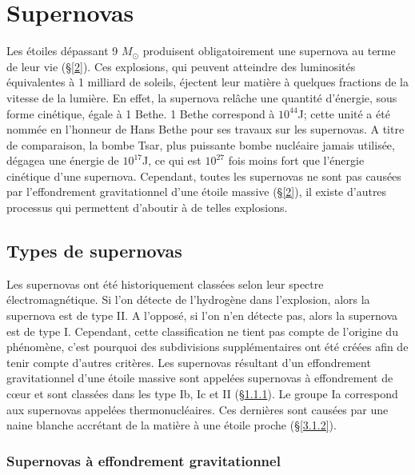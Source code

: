 
\chapterFormat
\chapter{Supernovas}\label{3}

Les étoiles dépassant 9 $M_\odot$ produisent obligatoirement une supernova au terme de leur vie (§\ref{2}). Ces explosions, qui peuvent atteindre des luminosités équivalentes à 1 milliard de soleils, éjectent leur matière à quelques fractions de la vitesse de la lumière. En effet, la supernova relâche une quantité d'énergie, sous forme cinétique, égale à 1 Bethe. 1 Bethe correspond à $10^{44}$J; cette unité a été nommée en l'honneur de Hans Bethe pour ses travaux sur les supernovas. A titre de comparaison, la bombe Tsar, plus puissante bombe nucléaire jamais utilisée, dégagea une énergie de $10^{17}$J, ce qui est $10^{27}$ fois moins fort que l'énergie cinétique d'une supernova. Cependant, toutes les supernovas ne sont pas causées par l'effondrement gravitationnel d'une étoile massive (§\ref{2}), il existe d'autres processus qui permettent d'aboutir à de telles explosions.

\section{Types de supernovas}\label{3.1} 

Les supernovas ont été historiquement classées selon leur spectre électromagnétique. Si l'on détecte de l'hydrogène dans l'explosion, alors la supernova est de type II. A l'opposé, si l'on n'en détecte pas, alors la supernova est de type I. Cependant, cette classification ne tient pas compte de l'origine du phénomène, c'est pourquoi des subdivisions supplémentaires ont été créées afin de tenir compte d'autres critères. Les supernovas résultant d'un effondrement gravitationnel d'une étoile massive sont appelées supernovas à effondrement de cœur et sont classées dans les type Ib, Ic et II (§\ref{3.1.1}). Le groupe Ia correspond aux supernovas appelées thermonucléaires. Ces dernières sont causées par une naine blanche accrétant de la matière à une étoile proche (§\ref{3.1.2}).

\subsection{Supernovas à effondrement gravitationnel}\label{3.1.1} 

